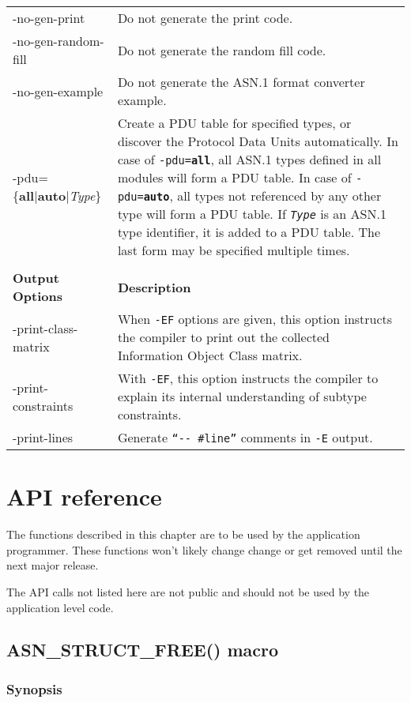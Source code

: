 \documentclass[english,oneside,12pt]{book}
\newcommand{\apisection}[2]{\clearpage\section{\label{#1}#2}}
\begin{document}
\begin{longtable}{lp{4in}}
{\ttfamily -no-gen-print} & {\small Do not generate the print code.}\\
{\ttfamily -no-gen-random-fill} & {\small Do not generate the random fill code.}\\
{\ttfamily -no-gen-example} & {\small Do not generate the ASN.1 format converter example.}\\
{\ttfamily -pdu=\{\textbf{all}|\textbf{auto}|\emph{Type}\}} & {\small Create a PDU table for specified types, or discover the Protocol Data Units automatically.
In case of \texttt{-pdu=\textbf{all}}, all ASN.1 types defined in all modules will form a PDU table. In case of \texttt{-pdu=\textbf{auto}}, all types not referenced by any other type will form a PDU table. If \texttt{\emph{Type}} is an ASN.1 type identifier, it is added to a PDU table. The last form may be specified multiple times.}\\ \\
\textbf{Output Options} & \textbf{Description}\\
\midrule
{\ttfamily -print-class-matrix} & {\small When \texttt{-EF} options are given, this option instructs the compiler to print out the collected Information Object Class matrix.}\\
{\ttfamily -print-constraints} & {\small With \texttt{-EF}, this option instructs the compiler
to explain its internal understanding of subtype constraints.}\\
{\ttfamily -print-lines} & {\small Generate \texttt{``-{}- \#line''} comments
in \texttt{-E} output.}\\
\end{longtable}
\renewcommand{\arraystretch}{1}


\chapter{API reference}

The functions described in this chapter are to be used by the application
programmer. These functions won't likely change change or get removed until
the next major release.

The API calls not listed here are not public and should not be used by the
application level code.

\apisection{sec:ASN_STRUCT_FREE}{ASN\_STRUCT\_FREE() macro}

\subsection*{Synopsis}
\end{document}
